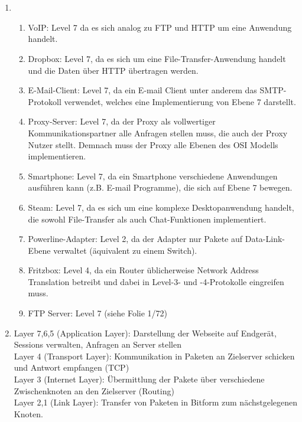\documentclass[a4paper,
			llpt,
			solution,
			accentcolor=tud2d,
			colorbacktitle
			]
			{tudexercise}
\begin{document}
\section{}
\begin{enumerate}
\item
\begin{enumerate}

\item
VoIP:
Level 7 da es sich analog zu FTP und HTTP um eine Anwendung handelt.

\item
Dropbox:
Level 7, da es sich um eine File-Transfer-Anwendung handelt und die Daten über HTTP übertragen werden.

\item
E-Mail-Client:
Level 7, da ein E-mail Client unter anderem das SMTP-Protokoll verwendet, welches eine Implementierung von Ebene 7 darstellt.

\item
Proxy-Server:
Level 7, da der Proxy als vollwertiger Kommunikationspartner alle Anfragen stellen muss, die auch der Proxy Nutzer stellt. Demnach muss der Proxy alle Ebenen des OSI Modells implementieren.

\item
Smartphone:
Level 7, da ein Smartphone verschiedene Anwendungen ausführen kann (z.B. E-mail Programme), die sich auf Ebene 7 bewegen.

\item
Steam:
Level 7, da es sich um eine komplexe Desktopanwendung handelt, die sowohl File-Transfer als auch Chat-Funktionen implementiert.

\item
Powerline-Adapter:
Level 2, da der Adapter nur Pakete auf Data-Link-Ebene verwaltet (äquivalent zu einem Switch).

\item
Fritzbox:
Level 4, da ein Router üblicherweise Network Address Translation betreibt und dabei in Level-3- und -4-Protokolle eingreifen muss.

\item
FTP Server:
Level 7 (siehe Folie 1/72)
\end{enumerate}
\item

Layer 7,6,5 (Application Layer): Darstellung der Webseite auf Endgerät, Sessions verwalten, Anfragen an Server stellen
\\
Layer 4 (Transport Layer): Kommunikation in Paketen an Zielserver schicken und Antwort empfangen (TCP)
\\
Layer 3 (Internet Layer): Übermittlung der Pakete über verschiedene Zwischenknoten an den Zielserver (Routing)
\\
Layer 2,1 (Link Layer): Transfer von Paketen in Bitform zum nächstgelegenen Knoten.


\end{enumerate}
\end{document}
